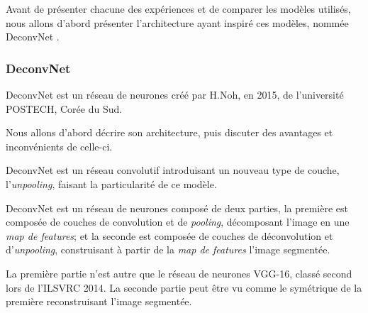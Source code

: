 \documentclass[a4paper, 11pt]{report}
\begin{document}
Avant de présenter chacune des expériences et de comparer les modèles utilisés, nous allons d'abord présenter l'architecture ayant inspiré ces modèles, nommée DeconvNet \citep{Noh2015}.

\subsubsection{DeconvNet}

DeconvNet est un réseau de neurones créé par H.Noh, en 2015, de l'université POSTECH, Corée du Sud.

Nous allons d'abord décrire son architecture, puis discuter des avantages et inconvénients de celle-ci.

DeconvNet est un réseau convolutif introduisant un nouveau type de couche, l'\emph{unpooling}, faisant la particularité de ce modèle.

DeconvNet est un réseau de neurones composé de deux parties, la première est composée de couches de convolution et de \emph{pooling}, décomposant l'image en une \emph{map de features}; et la seconde est composée de couches de déconvolution et d'\emph{unpooling}, construisant à partir de la \emph{map de features} l'image segmentée.

La première partie n'est autre que le réseau de neurones VGG-16, classé second lors de l'ILSVRC 2014.
La seconde partie peut être vu comme le symétrique de la première reconstruisant l'image segmentée.
\end{document}
